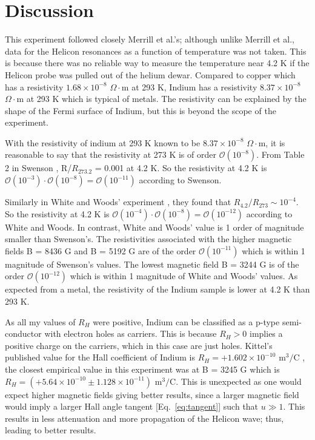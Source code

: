 \section{Discussion}

This experiment followed closely Merrill et al.'s; although unlike Merrill et al., data for the Helicon resonances as a function of temperature was not taken. This is because there was no reliable way to measure the temperature near 4.2 K if the Helicon probe was pulled out of the helium dewar. Compared to copper which has a resistivity $1.68 \times 10^{-8}$ $\Omega \cdot$m at 293 K, Indium has a resistivity $8.37 \times 10^{-8}$ $\Omega \cdot$m at 293 K which is typical of metals. The resistivity can be explained by the shape of the Fermi surface of Indium, but this is beyond the scope of the experiment.  

With the resistivity of indium at 293 K known to be $8.37 \times 10^{-8}$ $\Omega \cdot$m, it is reasonable to say that the resistivity at 273 K is of order $\mathcal{O}(10^{-8})$. From Table 2 in Swenson \cite{c5}, R/$R_{273.2}$ = 0.001 at 4.2 K. So the resistivity at 4.2 K is $\mathcal{O}(10^{-3}) \cdot \mathcal{O}(10^{-8}) = \mathcal{O}(10^{-11})$ according to Swenson.  
 
Similarly in White and Woods' experiment \cite{c2}, they found that $R_{4.2}/R_{273} \sim 10^{-4}$. So the resistivity at 4.2 K is $\mathcal{O}(10^{-4}) \cdot \mathcal{O}(10^{-8}) = \mathcal{O}(10^{-12})$ according to White and Woods. In contrast, White and Woods' value is 1 order of magnitude smaller than Swenson's. The resistivities associated with the higher magnetic fields B = 8436 G and B = 5192 G are of the order $\mathcal{O}(10^{-11})$ which is within 1 magnitude of Swenson's values. The lowest magnetic field B = 3244 G is of the order $\mathcal{O}(10^{-12})$ which is within 1 magnitude of White and Woods' values. As expected from a metal, the resistivity of the Indium sample is lower at 4.2 K than 293 K. 

As all my values of $R_H$ were positive, Indium can be classified as a p-type semi-conductor with electron holes as carriers. This is because $R_H > 0$ implies a positive charge on the carriers, which in this case are just holes. Kittel's published value for the Hall coefficient of Indium is $R_H = +1.602 \times 10^{-10}$ $\text{m}^3/\text{C}$ \cite{c3}, the closest empirical value in this experiment was at B = 3245 G which is $R_H = (+5.64 \times 10^{-10} \pm 1.128 \times 10^{-11})$ $\text{m}^3/\text{C}$. This is unexpected as one would expect higher magnetic fields giving better results, since a larger magnetic field would imply a larger Hall angle tangent [Eq.~\ref{eq:tangent}] such that $u \gg 1$. This results in less attenuation and more propagation of the Helicon wave; thus, leading to better results. 

